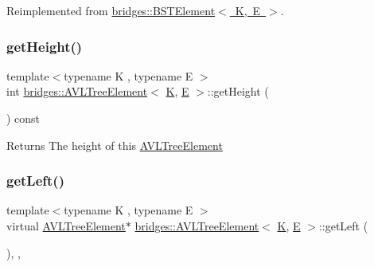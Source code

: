 Reimplemented from \mbox{\hyperlink{classbridges_1_1_b_s_t_element_af3843873c508c24f90b6e73a6f490bf8}{bridges\+::\+B\+S\+T\+Element$<$ K, E $>$}}.

\mbox{\label{classbridges_1_1_a_v_l_tree_element_ace72b436fa14db4f7844cc6e30b87aa7}} 
\subsubsection{\texorpdfstring{getHeight()}{getHeight()}}
{\footnotesize\ttfamily template$<$typename K , typename E $>$ \\
int \mbox{\hyperlink{classbridges_1_1_a_v_l_tree_element}{bridges\+::\+A\+V\+L\+Tree\+Element}}$<$ \mbox{\hyperlink{namespacebridges_acfb0a4f7877d8f63de3e6862004c50edaa5f3c6a11b03839d46af9fb43c97c188}{K}}, \mbox{\hyperlink{namespacebridges_acfb0a4f7877d8f63de3e6862004c50eda3a3ea00cfc35332cedf6e5e9a32e94da}{E}} $>$\+::get\+Height (\begin{DoxyParamCaption}{ }\end{DoxyParamCaption}) const\hspace{0.3cm}{\ttfamily [inline]}}

\begin{DoxyReturn}{Returns}
The height of this \mbox{\hyperlink{classbridges_1_1_a_v_l_tree_element}{A\+V\+L\+Tree\+Element}} 
\end{DoxyReturn}
\mbox{\label{classbridges_1_1_a_v_l_tree_element_a7b5d05660da127f5f6164120d9846d90}} 
\subsubsection{\texorpdfstring{getLeft()}{getLeft()}\hspace{0.1cm}{\footnotesize\ttfamily [1/2]}}
{\footnotesize\ttfamily template$<$typename K , typename E $>$ \\
virtual \mbox{\hyperlink{classbridges_1_1_a_v_l_tree_element}{A\+V\+L\+Tree\+Element}}$\ast$ \mbox{\hyperlink{classbridges_1_1_a_v_l_tree_element}{bridges\+::\+A\+V\+L\+Tree\+Element}}$<$ \mbox{\hyperlink{namespacebridges_acfb0a4f7877d8f63de3e6862004c50edaa5f3c6a11b03839d46af9fb43c97c188}{K}}, \mbox{\hyperlink{namespacebridges_acfb0a4f7877d8f63de3e6862004c50eda3a3ea00cfc35332cedf6e5e9a32e94da}{E}} $>$\+::get\+Left (\begin{DoxyParamCaption}{ }\end{DoxyParamCaption})\hspace{0.3cm}{\ttfamily [inline]}, {\ttfamily [override]}, {\ttfamily [virtual]}}

